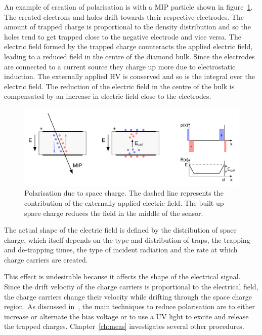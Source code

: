 An example of creation of polarisation is with a MIP particle shown in figure~\ref{fig:polar1}. The created electrons and holes drift towards their respective electrodes. The amount of trapped charge is proportional to the density distribution and so the holes tend to get trapped close to the negative electrode and vice versa. The electric field formed by the trapped charge counteracts the applied electric field, leading to a reduced field in the centre of the diamond bulk. Since the electrodes are connected to a current source they charge up more due to electrostatic induction. The externally applied HV is conserved and so is the integral over the electric field. The reduction of the electric field in the centre of the bulk is compensated by an increase in electric field close to the electrodes. 
\begin{figure}[!t]
\begin{center}
\includegraphics[width=0.9\linewidth]{02_pulse_formation/pics/plots/polar1}
\caption{Polarisation due to space charge. The dashed line represents the contribution of the externally applied electric field. The built up space charge reduces the field in the middle of the sensor.}
\label{fig:polar1}
\end{center}
\end{figure}
The actual shape of the electric field is defined by the distribution of space charge, which itself depends on the type and distribution of traps, the trapping and de-trapping times, the type of incident radiation and the rate at which charge carriers are created.

This effect is undesirable because it affects the shape of the electrical signal. Since the drift velocity of the charge carriers is proportional to the electrical field, the charge carriers change their velocity while drifting through the space charge region. As discussed in~\cite{Guthoff:1977429}, the main techniques to reduce polarisation are to either increase or alternate the bias voltage or to use a UV light to excite and release the trapped charges. Chapter~\ref{ch:meas} investigates several other procedures.


